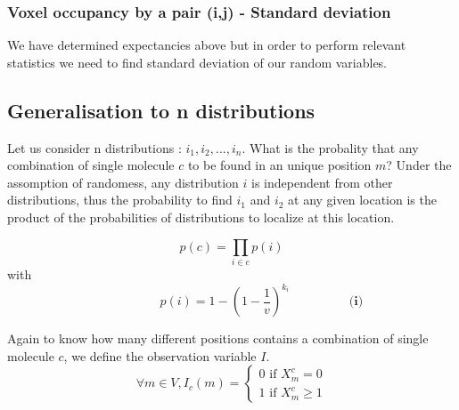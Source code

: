 \documentclass{article}
\begin{document}
\subsubsection{Voxel occupancy by a pair (i,j) - Standard deviation}

We have determined expectancies above but in order to perform relevant statistics we need to find standard deviation of our random variables.





\newpage
\subsection{Generalisation to n distributions}

Let us consider n distributions : $i_1, i_2, ..., i_n$. What is the probality that any combination of single molecule $c$ to be found in an unique position $m$?
Under the assomption of randomess, any distribution $i$ is independent from other distributions, thus the probability to find $i_1$ and $i_2$ at any given
location is the product of the probabilities of distributions to localize at this location.

\[
p(c) = \prod_{i \in c}p(i)
\]
with 
\begin{equation}
\hspace{2cm} p(i) = 1-(1-\frac{1}{v})^{k_i} \hspace{2cm} \textbf{(i)}
\end{equation}

Again to know how many different positions contains a combination of single molecule $c$, we define the observation variable $I$.
\[
\forall m \in V, I_c(m) = \begin{cases}
    0 \text{ if } X^c_m = 0 \\
    1 \text{ if } X^c_m \geq 1
\end{cases}
\]



\begin{figure}[h]
\centering
\end{figure}
\end{document}
